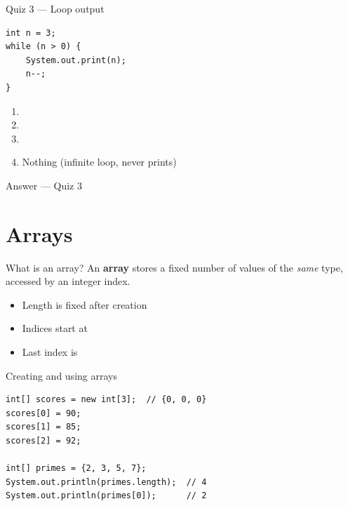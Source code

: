 \documentclass[aspectratio=169,11pt]{beamer}
\begin{document}
    \begin{frame}[fragile]{Quiz 3 --- Loop output}
        \begin{lstlisting}
int n = 3;
while (n > 0) {
    System.out.print(n);
    n--;
}
        \end{lstlisting}
        \begin{enumerate}
            \item {}
            \item {}
            \item {}
            \item Nothing (infinite loop, never prints)
        \end{enumerate}
        \quizpause
    \end{frame}

    \begin{frame}{Answer --- Quiz 3}
    \end{frame}

    \section{Arrays}

    \begin{frame}{What is an array?}
        An \textbf{array} stores a fixed number of values of the \emph{same} type,
        accessed by an integer index.
        \vspace{0.5em}
        \begin{itemize}
            \item Length is fixed after creation
            \item Indices start at 
            \item Last index is 
        \end{itemize}
    \end{frame}

    \begin{frame}[fragile]{Creating and using arrays}
        \begin{lstlisting}
int[] scores = new int[3];  // {0, 0, 0}
scores[0] = 90;
scores[1] = 85;
scores[2] = 92;

int[] primes = {2, 3, 5, 7};
System.out.println(primes.length);  // 4
System.out.println(primes[0]);      // 2
        \end{lstlisting}
    \end{frame}
\end{document}
